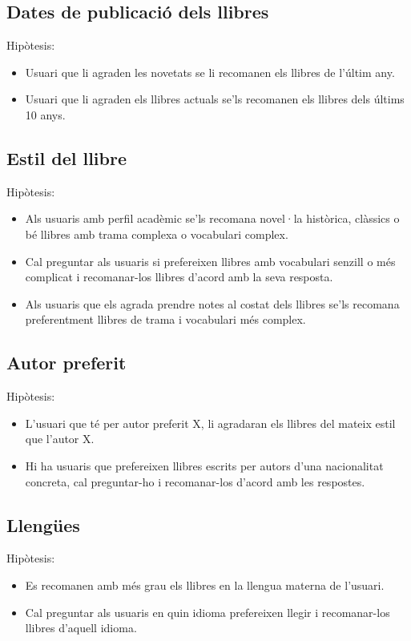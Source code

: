\subsection{Dates de publicació dels llibres}
Hipòtesis:
\begin{itemize}
  \item Usuari que li agraden les novetats se li recomanen els llibres de l'últim any.
  \item Usuari que li agraden els llibres actuals se'ls recomanen els llibres dels últims 10 anys.
\end{itemize}

\subsection{Estil del llibre}
Hipòtesis:
\begin{itemize}
  \item Als usuaris amb perfil acadèmic se'ls recomana novel·la històrica, clàssics o bé llibres amb trama complexa o vocabulari complex.
  \item Cal preguntar als usuaris si prefereixen llibres amb vocabulari senzill o més complicat i recomanar-los llibres d'acord amb la seva resposta.
  \item Als usuaris que els agrada prendre notes al costat dels llibres se'ls recomana preferentment llibres de trama i vocabulari més complex.
\end{itemize}

\subsection{Autor preferit}
Hipòtesis:
\begin{itemize}
  \item L'usuari que té per autor preferit X, li agradaran els llibres del mateix estil que l'autor X.
  \item Hi ha usuaris que prefereixen llibres escrits per autors d'una nacionalitat concreta, cal preguntar-ho i recomanar-los d'acord amb les respostes.
\end{itemize}

\subsection{Llengües}
Hipòtesis:
\begin{itemize}
  \item Es recomanen amb més grau els llibres en la llengua materna de l'usuari.
  \item Cal preguntar als usuaris en quin idioma prefereixen llegir i recomanar-los llibres d'aquell idioma.
\end{itemize}

